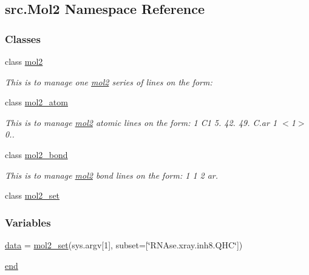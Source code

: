 \hypertarget{namespacesrc_1_1Mol2}{}\subsection{src.\+Mol2 Namespace Reference}
\label{namespacesrc_1_1Mol2}
\subsubsection*{Classes}
\begin{DoxyCompactItemize}
\item 
class \hyperlink{classsrc_1_1Mol2_1_1mol2}{mol2}
\begin{DoxyCompactList}\small\item\em This is to manage one \hyperlink{classsrc_1_1Mol2_1_1mol2}{mol2} series of lines on the form\+: \end{DoxyCompactList}\item 
class \hyperlink{classsrc_1_1Mol2_1_1mol2__atom}{mol2\+\_\+atom}
\begin{DoxyCompactList}\small\item\em This is to manage \hyperlink{classsrc_1_1Mol2_1_1mol2}{mol2} atomic lines on the form\+: 1 C1 5. 42. 49. C.\+ar 1 $<$1$>$ 0.. \end{DoxyCompactList}\item 
class \hyperlink{classsrc_1_1Mol2_1_1mol2__bond}{mol2\+\_\+bond}
\begin{DoxyCompactList}\small\item\em This is to manage \hyperlink{classsrc_1_1Mol2_1_1mol2}{mol2} bond lines on the form\+: 1 1 2 ar. \end{DoxyCompactList}\item 
class \hyperlink{classsrc_1_1Mol2_1_1mol2__set}{mol2\+\_\+set}
\end{DoxyCompactItemize}
\subsubsection*{Variables}
\begin{DoxyCompactItemize}
\item 
\hyperlink{namespacesrc_1_1Mol2_a12bf18db47042b1704de5e1fb05b2ade}{data} = \hyperlink{classsrc_1_1Mol2_1_1mol2__set}{mol2\+\_\+set}(sys.\+argv\mbox{[}1\mbox{]}, subset=\mbox{[}\char`\"{}R\+N\+Ase.\+xray.\+inh8.\+Q\+HC\char`\"{}\mbox{]})
\item 
\hyperlink{namespacesrc_1_1Mol2_a9545d4f9df750b91128fa8d78b7ca8b2}{end}
\end{DoxyCompactItemize}


